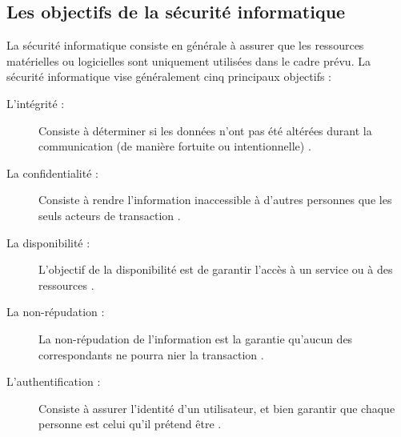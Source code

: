    \subsection{Les objectifs de la sécurité informatique}
    La sécurité informatique consiste en générale à assurer que les ressources matérielles ou logicielles sont 
    uniquement utilisées dans le cadre prévu. La sécurité informatique vise généralement cinq principaux objectifs :
    \begin{description}
        \item[L'intégrité :] Consiste à déterminer si les données n'ont pas été altérées durant la communication 
            (de manière fortuite ou intentionnelle) \cite{objectif_intrapole} .
        \item[La confidentialité :] Consiste à rendre l'information inaccessible à d'autres personnes que les 
            seuls acteurs de transaction \cite{objectif_comment_ca_marche} .
        \item[La disponibilité :] L'objectif de la disponibilité est de garantir l'accès à un service 
            ou à des ressources \cite{objectif_comment_ca_marche} .
        \item[La non-répudation :] La non-répudation de l'information est la garantie qu'aucun des correspondants 
            ne pourra nier la transaction \cite{objectif_comment_ca_marche} .
        \item[L'authentification :] Consiste à assurer l'identité d'un utilisateur, et bien garantir que chaque
            personne est celui qu'il prétend être \cite{objectif_intrapole} .
    \end{description} %

